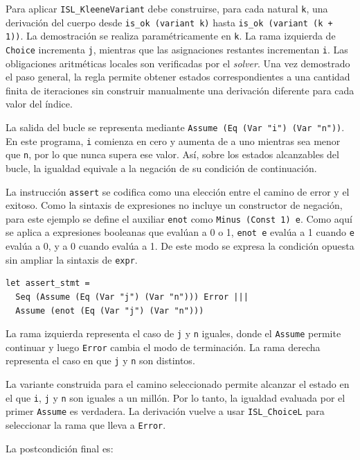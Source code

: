 \documentclass[a4paper,	11pt]{report}
\begin{document}
Para aplicar \lstinline|ISL_KleeneVariant| debe construirse,
para cada natural \lstinline|k|,
una derivación del cuerpo desde \lstinline|is_ok (variant k)| hasta \lstinline|is_ok (variant (k + 1))|.
La demostración se realiza paramétricamente en \lstinline|k|.
La rama izquierda de \lstinline|Choice| incrementa \lstinline|j|,
mientras que las asignaciones restantes incrementan \lstinline|i|.
Las obligaciones aritméticas locales son verificadas por el \emph{solver}.
Una vez demostrado el paso general,
la regla permite obtener estados correspondientes a una cantidad finita de iteraciones
sin construir manualmente una derivación diferente para cada valor del índice.

La salida del bucle se representa mediante \lstinline|Assume (Eq (Var "i") (Var "n"))|.
En este programa,
\lstinline|i| comienza en cero y aumenta de a uno mientras sea menor que \lstinline|n|,
por lo que nunca supera ese valor.
Así,
sobre los estados alcanzables del bucle,
la igualdad equivale a la negación de su condición de continuación.

La instrucción \lstinline|assert| se codifica como una elección entre el camino de error y el exitoso.
Como la sintaxis de expresiones no incluye un constructor de negación,
para este ejemplo se define el auxiliar \lstinline|enot| como \lstinline|Minus (Const 1) e|.
Como aquí se aplica a expresiones booleanas que evalúan a 0 o 1,
\lstinline|enot e| evalúa a 1 cuando \lstinline|e| evalúa a 0,
y a 0 cuando evalúa a 1.
De este modo se expresa la condición opuesta sin ampliar la sintaxis de \lstinline|expr|.

\begin{lstlisting}
let assert_stmt =
  Seq (Assume (Eq (Var "j") (Var "n"))) Error |||
  Assume (enot (Eq (Var "j") (Var "n")))
\end{lstlisting}
La rama izquierda representa el caso de \lstinline|j| y \lstinline|n| iguales,
donde el \lstinline|Assume| permite continuar y luego \lstinline|Error| cambia el modo de terminación.
La rama derecha representa el caso en que \lstinline|j| y \lstinline|n| son distintos.

La variante construida para el camino seleccionado permite alcanzar el estado en el que \lstinline|i|,
\lstinline|j| y \lstinline|n| son iguales a un millón.
Por lo tanto,
la igualdad evaluada por el primer \lstinline|Assume| es verdadera.
La derivación vuelve a usar \lstinline|ISL_ChoiceL| para seleccionar la rama que lleva a \lstinline|Error|.

La postcondición final es:
\end{document}
